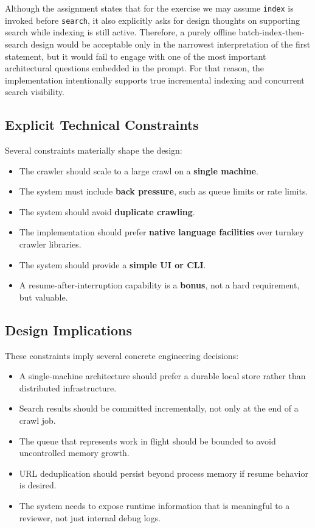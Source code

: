 \documentclass[pdftex,12pt,a4paper]{article}
\begin{document}
Although the assignment states that for the exercise we may assume \texttt{index} is invoked before \texttt{search}, it also explicitly asks for design thoughts on supporting search while indexing is still active. Therefore, a purely offline batch-index-then-search design would be acceptable only in the narrowest interpretation of the first statement, but it would fail to engage with one of the most important architectural questions embedded in the prompt. For that reason, the implementation intentionally supports true incremental indexing and concurrent search visibility.

\subsection{Explicit Technical Constraints}

Several constraints materially shape the design:

\begin{itemize}
    \item The crawler should scale to a large crawl on a \textbf{single machine}.
    \item The system must include \textbf{back pressure}, such as queue limits or rate limits.
    \item The system should avoid \textbf{duplicate crawling}.
    \item The implementation should prefer \textbf{native language facilities} over turnkey crawler libraries.
    \item The system should provide a \textbf{simple UI or CLI}.
    \item A resume-after-interruption capability is a \textbf{bonus}, not a hard requirement, but valuable.
\end{itemize}

\subsection{Design Implications}

These constraints imply several concrete engineering decisions:

\begin{itemize}
    \item A single-machine architecture should prefer a durable local store rather than distributed infrastructure.
    \item Search results should be committed incrementally, not only at the end of a crawl job.
    \item The queue that represents work in flight should be bounded to avoid uncontrolled memory growth.
    \item URL deduplication should persist beyond process memory if resume behavior is desired.
    \item The system needs to expose runtime information that is meaningful to a reviewer, not just internal debug logs.
\end{itemize}
\end{document}
